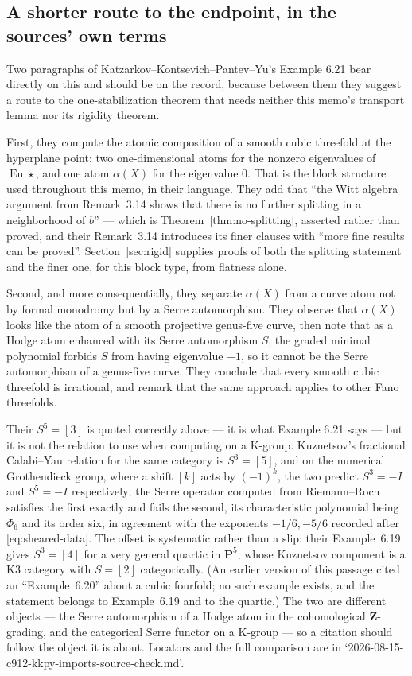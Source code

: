 \documentclass[11pt]{article}
\theoremstyle{definition}
\theoremstyle{remark}
\newcommand{\PP}{\mathbf P}
\begin{document}
\subsection*{A shorter route to the endpoint, in the sources' own terms}


Two paragraphs of Katzarkov--Kontsevich--Pantev--Yu's Example 6.21 bear directly
on this and should be on the record, because between them they suggest a route
to the one-stabilization theorem that needs neither this memo's transport lemma
nor its rigidity theorem.

First, they compute the atomic composition of a smooth cubic threefold at the
hyperplane point: two one-dimensional atoms for the nonzero eigenvalues of
$\operatorname{Eu}\star$, and one atom $\alpha(X)$ for the eigenvalue $0$. That
is the block structure used throughout this memo, in their language. They add
that ``the Witt algebra argument from Remark~3.14 shows that there is no further
splitting in a neighborhood of $b$'' --- which is
Theorem~\textup{[thm:no-splitting]}, asserted rather than proved, and their
Remark~3.14 introduces its finer clauses with ``more fine results can be
proved''. Section~\textup{[sec:rigid]} supplies proofs of both the splitting
statement and the finer one, for this block type, from flatness alone.

Second, and more consequentially, they separate $\alpha(X)$ from a curve atom
not by formal monodromy but by a Serre automorphism. They observe that
$\alpha(X)$ looks like the atom of a smooth projective genus-five curve, then
note that as a Hodge atom enhanced with its Serre automorphism $S$, the graded
minimal polynomial forbids $S$ from having eigenvalue $-1$, so it cannot be the
Serre automorphism of a genus-five curve. They conclude that every smooth cubic
threefold is irrational, and remark that the same approach applies to other Fano
threefolds.

Their $S^5=[3]$ is quoted correctly above --- it is what Example 6.21 says --- but
it is not the relation to use when computing on a K-group. Kuznetsov's fractional
Calabi--Yau relation for the same category is $S^3=[5]$, and on the numerical
Grothendieck group, where a shift $[k]$ acts by $(-1)^k$, the two predict
$S^3=-I$ and $S^5=-I$ respectively; the Serre operator computed from
Riemann--Roch satisfies the first exactly and fails the second, its
characteristic polynomial being $\Phi_6$ and its order six, in agreement with the
exponents $-1/6,-5/6$ recorded after \textup{[eq:sheared-data]}. The offset is
systematic rather than a slip: their Example~6.19 gives $S^3=[4]$ for a very
general quartic in $\PP^5$, whose Kuznetsov component is a K3 category with
$S=[2]$ categorically. (An earlier version of this passage cited an
``Example~6.20'' about a cubic fourfold; no such example exists, and the
statement belongs to Example~6.19 and to the quartic.)
The two are different objects --- the Serre automorphism of a Hodge atom in the
cohomological $\mathbf Z$-grading, and the categorical Serre functor on a K-group
--- so a citation should follow the object it is about. Locators and the full
comparison are in `2026-08-15-c912-kkpy-imports-source-check.md'.
\end{document}
